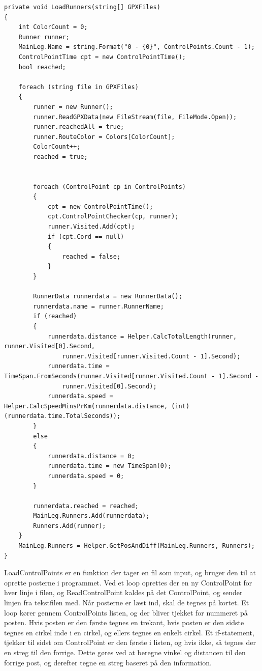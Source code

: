 \begin{lstlisting}
private void LoadRunners(string[] GPXFiles)
{
    int ColorCount = 0;
    Runner runner;
    MainLeg.Name = string.Format("0 - {0}", ControlPoints.Count - 1);
    ControlPointTime cpt = new ControlPointTime();
    bool reached;

    foreach (string file in GPXFiles)
    {
        runner = new Runner();
        runner.ReadGPXData(new FileStream(file, FileMode.Open));
        runner.reachedAll = true;
        runner.RouteColor = Colors[ColorCount];
        ColorCount++;
        reached = true;


        foreach (ControlPoint cp in ControlPoints)
        {
            cpt = new ControlPointTime();
            cpt.ControlPointChecker(cp, runner);
            runner.Visited.Add(cpt);
            if (cpt.Cord == null)
            {
                reached = false;
            }
        }

        RunnerData runnerdata = new RunnerData();
        runnerdata.name = runner.RunnerName;
        if (reached)
        {
            runnerdata.distance = Helper.CalcTotalLength(runner, runner.Visited[0].Second,
                runner.Visited[runner.Visited.Count - 1].Second);
            runnerdata.time = TimeSpan.FromSeconds(runner.Visited[runner.Visited.Count - 1].Second -
                runner.Visited[0].Second);
            runnerdata.speed = Helper.CalcSpeedMinsPrKm(runnerdata.distance, (int)(runnerdata.time.TotalSeconds));
        }
        else
        {
            runnerdata.distance = 0;
            runnerdata.time = new TimeSpan(0);
            runnerdata.speed = 0;
        }

        runnerdata.reached = reached;
        MainLeg.Runners.Add(runnerdata);
        Runners.Add(runner);
    }
    MainLeg.Runners = Helper.GetPosAndDiff(MainLeg.Runners, Runners);
}
\end{lstlisting}

LoadControlPoints er en funktion der tager en fil som input, og bruger den til at oprette posterne i programmet. Ved et loop oprettes der en ny ControlPoint for hver linje i filen, og ReadControlPoint kaldes på det ControlPoint, og sender linjen fra tekstfilen med. 
Når posterne er læst ind, skal de tegnes på kortet. Et loop kører gennem ControlPoints listen, og der bliver tjekket for nummeret på posten. Hvis posten er den første tegnes en trekant, hvis posten er den sidste tegnes en cirkel inde i en cirkel, og ellers tegnes en enkelt cirkel. 
Et if-statement, tjekker til sidst om ControlPoint er den første i listen, og hvis ikke, så tegnes der en streg til den forrige. Dette gøres ved at beregne vinkel og distancen til den forrige post, og derefter tegne en streg baseret på den information. 

